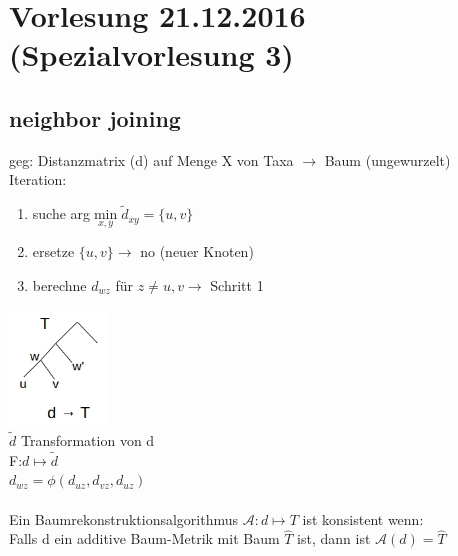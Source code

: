 \section{Vorlesung 21.12.2016 (Spezialvorlesung 3)}
\subsection{neighbor joining}
geg: Distanzmatrix (d) auf Menge X von Taxa $\rightarrow$ Baum (ungewurzelt)\\
Iteration:
\begin{enumerate}
	\item suche arg$\min \limits_{x,y} \tilde d_{xy}=\{u,v\}$
	\item ersetze $\{u,v\} \rightarrow$ no (neuer Knoten)
	\item berechne $d_{wz}$ für $z \neq u,v \rightarrow$ Schritt 1
\end{enumerate}
\includegraphics[width=0.2\textwidth]{lectures/161221/pix/1.jpg}\\
$\tilde d$ Transformation von d\\
F:$d \mapsto \tilde d$\\
$d_{wz}=\phi(d_{uz}, d_{vz}, d_{uz})$
\\\\
Ein Baumrekonstruktionsalgorithmus $\mathcal{A}:d \mapsto T$ ist konsistent wenn:\\
Falls d ein additive Baum-Metrik mit Baum $\hat T$ ist, dann ist $\mathcal{A}(d)=\hat T$

